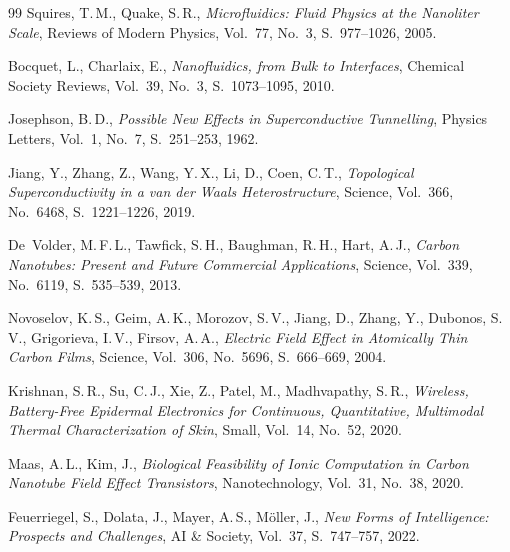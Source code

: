 ﻿\documentclass[a4paper,12pt]{scrreprt}
\theoremstyle{definition}
\begin{document}
\begin{thebibliography}{99}
	Squires, T.\,M., Quake, S.\,R.,
	\textit{Microfluidics: Fluid Physics at the Nanoliter Scale},
	Reviews of Modern Physics, Vol.~77, No.~3, S.~977--1026, 2005.
	
	Bocquet, L., Charlaix, E.,
	\textit{Nanofluidics, from Bulk to Interfaces},
	Chemical Society Reviews, Vol.~39, No.~3, S.~1073--1095, 2010.
	
	Josephson, B.\,D.,
	\textit{Possible New Effects in Superconductive Tunnelling},
	Physics Letters, Vol.~1, No.~7, S.~251--253, 1962.
	
	Jiang, Y., Zhang, Z., Wang, Y.\,X., Li, D., Coen, C.\,T.,
	\textit{Topological Superconductivity in a van der Waals Heterostructure},
	Science, Vol.~366, No.~6468, S.~1221--1226, 2019.
	
	De~Volder, M.\,F.\,L., Tawfick, S.\,H., Baughman, R.\,H., Hart, A.\,J.,
	\textit{Carbon Nanotubes: Present and Future Commercial Applications},
	Science, Vol.~339, No.~6119, S.~535--539, 2013.
	
	Novoselov, K.\,S., Geim, A.\,K., Morozov, S.\,V., Jiang, D., Zhang, Y.,
	Dubonos, S.\,V., Grigorieva, I.\,V., Firsov, A.\,A.,
	\textit{Electric Field Effect in Atomically Thin Carbon Films},
	Science, Vol.~306, No.~5696, S.~666--669, 2004.
	
	Krishnan, S.\,R., Su, C.\,J., Xie, Z., Patel, M., Madhvapathy, S.\,R.,
	\textit{Wireless, Battery-Free Epidermal Electronics for Continuous,
		Quantitative, Multimodal Thermal Characterization of Skin},
	Small, Vol.~14, No.~52, 2020.
	
	Maas, A.\,L., Kim, J.,
	\textit{Biological Feasibility of Ionic Computation in Carbon Nanotube
		Field Effect Transistors},
	Nanotechnology, Vol.~31, No.~38, 2020.
	
	Feuerriegel, S., Dolata, J., Mayer, A.\,S., Möller, J.,
	\textit{New Forms of Intelligence: Prospects and Challenges},
	AI \& Society, Vol.~37, S.~747--757, 2022.
	
\end{thebibliography}
	
\end{document}

